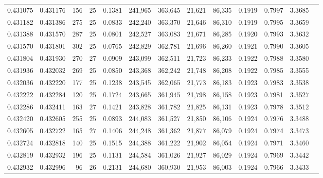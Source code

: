 \begin{tabular}{rrrrrrrrrrrrr}
0.431075 & 0.431176 & 156 &  25 &                                     0.1381 & 241,965 & 363,645 &  21,621 &  86,335 & 0.1919 & 0.7997 & 3.3685 \\
0.431182 & 0.431386 & 275 &  25 &                                     0.0833 & 242,240 & 363,370 &  21,646 &  86,310 & 0.1919 & 0.7995 & 3.3659 \\
0.431388 & 0.431570 & 287 &  25 &                                     0.0801 & 242,527 & 363,083 &  21,671 &  86,285 & 0.1920 & 0.7993 & 3.3632 \\
0.431570 & 0.431801 & 302 &  25 &                                     0.0765 & 242,829 & 362,781 &  21,696 &  86,260 & 0.1921 & 0.7990 & 3.3605 \\
0.431804 & 0.431930 & 270 &  27 &                                     0.0909 & 243,099 & 362,511 &  21,723 &  86,233 & 0.1922 & 0.7988 & 3.3580 \\
0.431936 & 0.432032 & 269 &  25 &                                     0.0850 & 243,368 & 362,242 &  21,748 &  86,208 & 0.1922 & 0.7985 & 3.3555 \\
0.432036 & 0.432220 & 177 &  25 &                                     0.1238 & 243,545 & 362,065 &  21,773 &  86,183 & 0.1923 & 0.7983 & 3.3538 \\
0.432222 & 0.432284 & 120 &  25 &                                     0.1724 & 243,665 & 361,945 &  21,798 &  86,158 & 0.1923 & 0.7981 & 3.3527 \\
0.432286 & 0.432411 & 163 &  27 &                                     0.1421 & 243,828 & 361,782 &  21,825 &  86,131 & 0.1923 & 0.7978 & 3.3512 \\
0.432420 & 0.432605 & 255 &  25 &                                     0.0893 & 244,083 & 361,527 &  21,850 &  86,106 & 0.1924 & 0.7976 & 3.3488 \\
0.432605 & 0.432722 & 165 &  27 &                                     0.1406 & 244,248 & 361,362 &  21,877 &  86,079 & 0.1924 & 0.7974 & 3.3473 \\
0.432724 & 0.432818 & 140 &  25 &                                     0.1515 & 244,388 & 361,222 &  21,902 &  86,054 & 0.1924 & 0.7971 & 3.3460 \\
0.432819 & 0.432932 & 196 &  25 &                                     0.1131 & 244,584 & 361,026 &  21,927 &  86,029 & 0.1924 & 0.7969 & 3.3442 \\
0.432932 & 0.432996 &  96 &  26 &                                     0.2131 & 244,680 & 360,930 &  21,953 &  86,003 & 0.1924 & 0.7966 & 3.3433 \\

\end{tabular}
